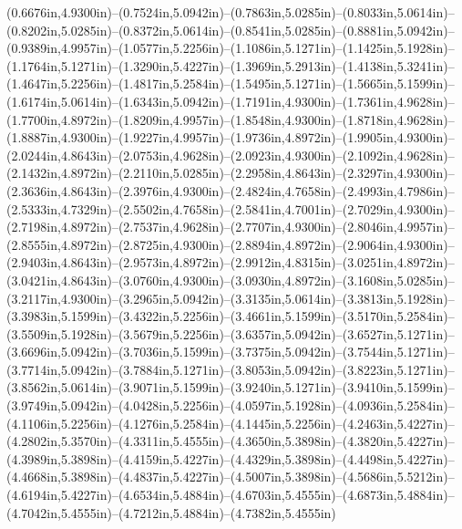 (0.6676in,4.9300in)--(0.7524in,5.0942in)--(0.7863in,5.0285in)--(0.8033in,5.0614in)--(0.8202in,5.0285in)--(0.8372in,5.0614in)--(0.8541in,5.0285in)--(0.8881in,5.0942in)--(0.9389in,4.9957in)--(1.0577in,5.2256in)--(1.1086in,5.1271in)--(1.1425in,5.1928in)--(1.1764in,5.1271in)--(1.3290in,5.4227in)--(1.3969in,5.2913in)--(1.4138in,5.3241in)--(1.4647in,5.2256in)--(1.4817in,5.2584in)--(1.5495in,5.1271in)--(1.5665in,5.1599in)--(1.6174in,5.0614in)--(1.6343in,5.0942in)--(1.7191in,4.9300in)--(1.7361in,4.9628in)--(1.7700in,4.8972in)--(1.8209in,4.9957in)--(1.8548in,4.9300in)--(1.8718in,4.9628in)--(1.8887in,4.9300in)--(1.9227in,4.9957in)--(1.9736in,4.8972in)--(1.9905in,4.9300in)--(2.0244in,4.8643in)--(2.0753in,4.9628in)--(2.0923in,4.9300in)--(2.1092in,4.9628in)--(2.1432in,4.8972in)--(2.2110in,5.0285in)--(2.2958in,4.8643in)--(2.3297in,4.9300in)--(2.3636in,4.8643in)--(2.3976in,4.9300in)--(2.4824in,4.7658in)--(2.4993in,4.7986in)--(2.5333in,4.7329in)--(2.5502in,4.7658in)--(2.5841in,4.7001in)--(2.7029in,4.9300in)--(2.7198in,4.8972in)--(2.7537in,4.9628in)--(2.7707in,4.9300in)--(2.8046in,4.9957in)--(2.8555in,4.8972in)--(2.8725in,4.9300in)--(2.8894in,4.8972in)--(2.9064in,4.9300in)--(2.9403in,4.8643in)--(2.9573in,4.8972in)--(2.9912in,4.8315in)--(3.0251in,4.8972in)--(3.0421in,4.8643in)--(3.0760in,4.9300in)--(3.0930in,4.8972in)--(3.1608in,5.0285in)--(3.2117in,4.9300in)--(3.2965in,5.0942in)--(3.3135in,5.0614in)--(3.3813in,5.1928in)--(3.3983in,5.1599in)--(3.4322in,5.2256in)--(3.4661in,5.1599in)--(3.5170in,5.2584in)--(3.5509in,5.1928in)--(3.5679in,5.2256in)--(3.6357in,5.0942in)--(3.6527in,5.1271in)--(3.6696in,5.0942in)--(3.7036in,5.1599in)--(3.7375in,5.0942in)--(3.7544in,5.1271in)--(3.7714in,5.0942in)--(3.7884in,5.1271in)--(3.8053in,5.0942in)--(3.8223in,5.1271in)--(3.8562in,5.0614in)--(3.9071in,5.1599in)--(3.9240in,5.1271in)--(3.9410in,5.1599in)--(3.9749in,5.0942in)--(4.0428in,5.2256in)--(4.0597in,5.1928in)--(4.0936in,5.2584in)--(4.1106in,5.2256in)--(4.1276in,5.2584in)--(4.1445in,5.2256in)--(4.2463in,5.4227in)--(4.2802in,5.3570in)--(4.3311in,5.4555in)--(4.3650in,5.3898in)--(4.3820in,5.4227in)--(4.3989in,5.3898in)--(4.4159in,5.4227in)--(4.4329in,5.3898in)--(4.4498in,5.4227in)--(4.4668in,5.3898in)--(4.4837in,5.4227in)--(4.5007in,5.3898in)--(4.5686in,5.5212in)--(4.6194in,5.4227in)--(4.6534in,5.4884in)--(4.6703in,5.4555in)--(4.6873in,5.4884in)--(4.7042in,5.4555in)--(4.7212in,5.4884in)--(4.7382in,5.4555in) 